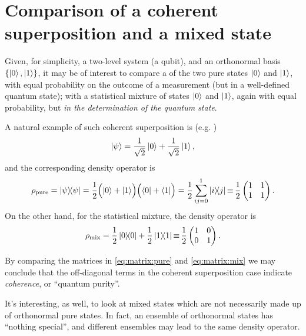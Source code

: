 \section{Comparison of a coherent superposition and a mixed state}
\label{sec:mix}

Given, for simplicity, a two-level system (a qubit), and an orthonormal basis
$\left\{\ket{0}, \ket{1}\right\}$, it may be of interest to compare a 
of the two pure states $\ket{0}$ and $\ket{1}$, with equal probability on the outcome of
a measurement (but in a well-defined quantum state); with a statistical mixture of
states $\ket{0}$ and $\ket{1}$, again with equal probability, but 
\emph{in the determination of the quantum state}.

A natural example of such coherent superposition is (e.g. \cite[Example 2.4]{Nakahara})
\[
  \ket{\psi} = \frac{1}{\sqrt{2}}\ket{0} + \frac{1}{\sqrt{2}}\ket{1}\text{,}
\]
and the corresponding density operator is
\begin{multline}\label{eq:matrix:pure}
  \rho_{\mathrm{pure}} = \ketbra{\psi}{\psi} =
  \frac{1}{2}\qty\Big(\ket{0} + \ket{1}) \qty\Big(\bra{0} + \bra{1}) =
  \frac{1}{2}\sum_{ij=0}^1\ketbra{i}{j} \operatorname*{\equiv}
  \frac{1}{2}
    \begin{pmatrix}
      1 &1  \\
      1 &1  \\
    \end{pmatrix}
  \text{.}
\end{multline}
On the other hand, for the statistical mixture, the density operator is
\begin{equation}\label{eq:matrix:mix}
  \rho_{\mathrm{mix}} = \frac{1}{2}\ketbra{0}{0} + \frac{1}{2}\ketbra{1}{1} \operatorname*{\equiv}
  \frac{1}{2}
    \begin{pmatrix}
      1 &0  \\
      0 &1  \\
    \end{pmatrix}
  \text{.}
\end{equation}

By comparing the matrices in \eqref{eq:matrix:pure} and \eqref{eq:matrix:mix}
we may conclude that the off-diagonal terms in the coherent superposition case
indicate \emph{coherence}, or ``quantum purity''.

It's interesting, as well, to look at mixed states
which are not necessarily made up of orthonormal pure states.
In fact, an ensemble of orthonormal states has ``nothing special'',
and different ensembles may lead to the same density operator.

